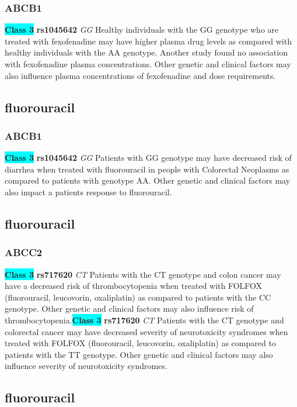 \documentclass{book}
\begin{document}
\subsubsection{ ABCB1 }

\begin{center}
\textbf{\colorbox{cyan} {Class 3}} \textbf{ rs1045642 } \textit{ GG }
Healthy individuals with the GG genotype who are treated with fexofenadine may have higher plasma drug levels as compared with healthy individuals with the AA genotype. Another study found no association with fexofenadine plasma concentrations. Other genetic and clinical factors may also influence plasma concentrations of fexofenadine and dose requirements.


\end{center}\subsection{ fluorouracil }


\subsubsection{ ABCB1 }

\begin{center}
\textbf{\colorbox{cyan} {Class 3}} \textbf{ rs1045642 } \textit{ GG }
Patients with GG genotype may have decreased risk of diarrhea when treated with fluorouracil in people with Colorectal Neoplasms as compared to patients with genotype AA. Other genetic and clinical factors may also impact a patients response to fluorouracil.


\end{center}\subsection{ fluorouracil }


\subsubsection{ ABCC2 }

\begin{center}
\textbf{\colorbox{cyan} {Class 3}} \textbf{ rs717620 } \textit{ CT }
Patients with the CT genotype and colon cancer may have a decreased risk of thrombocytopenia when treated with FOLFOX (fluorouracil, leucovorin, oxaliplatin) as compared to patients with the CC genotype. Other genetic and clinical factors may also influence risk of thrombocytopenia.\textbf{\colorbox{cyan} {Class 3}} \textbf{ rs717620 } \textit{ CT }
Patients with the CT genotype and colorectal cancer may have decreased severity of neurotoxicity syndromes when treated with FOLFOX (fluorouracil, leucovorin, oxaliplatin) as compared to patients with the TT genotype. Other genetic and clinical factors may also influence severity of neurotoxicity syndromes.


\end{center}\subsection{ fluorouracil }
\end{document}
